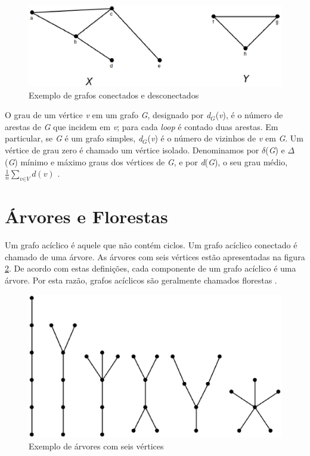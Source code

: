 \begin{apendicesenv}
\begin{figure}[!h]
	\centering
	\includegraphics[scale=0.45]{figuras/capitulo2/desconectados.eps}
	\caption[Exemplo de grafos conectados e desconectados]{Exemplo de grafos conectados e desconectados \cite{Bondy:2007}}
	\label{desconectados}
\end{figure}

O grau de um vértice \textit{v} em um grafo \textit{G}, designado por \textit{d$_G$}(\textit{v}), é o número de arestas de \textit{G} que incidem em \textit{v}; para cada \textit{loop} é contado duas arestas. Em particular, se \textit{G} é um grafo simples, \textit{d$_G$}(\textit{v}) é o número de vizinhos de \textit{v} em \textit{G}. Um vértice de grau zero é chamado um vértice isolado. Denominamos por $\delta$(\textit{G}) e $\Delta$(\textit{G}) mínimo e máximo graus dos vértices de \textit{G}, e por \textit{d}(\textit{G}), o seu grau médio, $\frac{1}{n}\sum_{\textit{v}\in\textit{V}} \textit{d}(\textit{v})$ \cite{Diestel:1997}.

\section{Árvores e Florestas}

Um grafo acíclico é aquele que não contém ciclos. Um grafo acíclico conectado é chamado de uma árvore. As árvores com seis vértices estão apresentadas na figura \ref{arvores_seis_vertices}. De acordo com estas definições, cada componente de um grafo acíclico é uma árvore. Por esta razão, grafos acíclicos são geralmente chamados florestas \cite{Bondy:2007}.

\begin{figure}[!h]
	\centering
	\includegraphics[scale=0.2]{figuras/capitulo2/arvores_seis_vertices.eps}
	\caption[Exemplo de árvores com seis vértices]{Exemplo de árvores com seis vértices \cite{Bondy:2007}}
	\label{arvores_seis_vertices}
\end{figure}


\end{apendicesenv}
